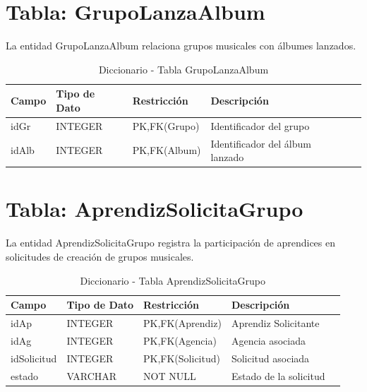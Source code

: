 \documentclass[12pt,a4paper,spanish,oneside]{report}
\begin{document}
\section{Tabla: GrupoLanzaAlbum}
La entidad GrupoLanzaAlbum relaciona grupos musicales con álbumes lanzados.
\begin{table}[H]
\centering
\caption{Diccionario - Tabla GrupoLanzaAlbum}
\begin{tabular}{|l|l|l|l|l|}
\hline
\textbf{Campo} & \textbf{Tipo de Dato} & \textbf{Restricción} & \textbf{Descripción} \\
\hline
idGr & INTEGER & PK,FK(Grupo) & Identificador del grupo \\
\hline
idAlb & INTEGER & PK,FK(Album) & Identificador del álbum lanzado \\
\hline
\end{tabular}
\end{table}

\section{Tabla: AprendizSolicitaGrupo}
La entidad AprendizSolicitaGrupo registra la participación de aprendices en solicitudes de creación de grupos musicales.
\begin{table}[H]
\centering
\caption{Diccionario - Tabla AprendizSolicitaGrupo}
\begin{tabular}{|l|l|l|l|l|}
\hline
\textbf{Campo} & \textbf{Tipo de Dato} & \textbf{Restricción} & \textbf{Descripción} \\
\hline
idAp & INTEGER & PK,FK(Aprendiz) & Aprendiz Solicitante \\
\hline
idAg & INTEGER & PK,FK(Agencia) & Agencia asociada \\
\hline
idSolicitud & INTEGER & PK,FK(Solicitud) & Solicitud asociada \\
\hline
estado & VARCHAR & NOT NULL & Estado de la solicitud \\
\hline
\end{tabular}
\end{table}
\end{document}
